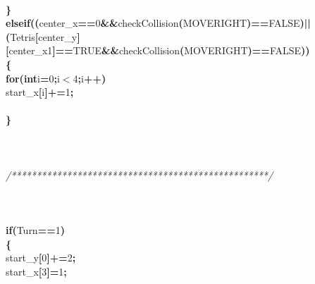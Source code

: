 \documentclass[a4paper, 10pt]{article}
\newcommand\SPC{\hspace*{0.6em}}
\newcommand\HYP{\mbox{\char 45}}
\newcommand{\CppAComment}[1]{\textit{\textcolor[rgb]{0.2,0.6,1}{#1}}}
\newcommand{\CppAIdentifier}[1]{#1}
\newcommand{\CppANumber}[1]{\textcolor[rgb]{0.5,0,0.5}{#1}}
\newcommand{\CppAReservedWord}[1]{\textbf{#1}}
\newcommand{\CppASpace}[1]{\colorbox[rgb]{1,1,1}{#1}}
\newcommand{\CppASymbol}[1]{\textbf{\textcolor[rgb]{1,0,0}{#1}}}
\begin{document}
\begin{ttfamily}
\\
\CppASpace{\SPC \SPC \SPC \SPC }\CppASymbol{\}}\\
\CppASpace{\SPC \SPC \SPC \SPC }\CppAReservedWord{else}\CppASpace{\SPC }\CppAReservedWord{if}\CppASymbol{(}\CppASymbol{(}\CppAIdentifier{center\_x}\CppASymbol{==}\CppANumber{0}\CppASpace{\SPC }\CppASymbol{\&\&}\CppASpace{\SPC }\CppAIdentifier{checkCollision}\CppASymbol{(}\CppAIdentifier{MOVERIGHT}\CppASymbol{)}\CppASymbol{==}\CppAIdentifier{FALSE}\CppASymbol{)}\CppASpace{\SPC }\CppASymbol{||}\CppASpace{\SPC }\CppASymbol{(}\CppAIdentifier{Tetris}\CppASymbol{[}\CppAIdentifier{center\_y}\CppASymbol{]}\CppASymbol{[}\CppAIdentifier{center\_x}\CppASymbol{\HYP }\CppANumber{1}\CppASymbol{]}\CppASymbol{==}\CppAIdentifier{TRUE}\CppASymbol{\&\&}\CppAIdentifier{checkCollision}\CppASymbol{(}\CppAIdentifier{MOVERIGHT}\CppASymbol{)}\CppASymbol{==}\CppAIdentifier{FALSE}\CppASymbol{)}\CppASymbol{)}\\
\CppASpace{\SPC \SPC \SPC \SPC }\CppASymbol{\{}\\
\CppASpace{\SPC \SPC \SPC \SPC \SPC }\CppAReservedWord{for}\CppASymbol{(}\CppAReservedWord{int}\CppASpace{\SPC }\CppAIdentifier{i}\CppASymbol{=}\CppANumber{0}\CppASymbol{;}\CppAIdentifier{i}\CppASymbol{$<$}\CppANumber{4}\CppASymbol{;}\CppAIdentifier{i}\CppASymbol{++}\CppASymbol{)}\\
\CppASpace{\SPC \SPC \SPC \SPC \SPC \SPC }\CppAIdentifier{start\_x}\CppASymbol{[}\CppAIdentifier{i}\CppASymbol{]}\CppASymbol{+=}\CppANumber{1}\CppASymbol{;}\\
\\
\CppASpace{\SPC \SPC \SPC \SPC }\CppASymbol{\}}\\
\\
\\
\\
\CppASpace{\SPC \SPC \SPC }\CppAComment{/***************************************************/}\\
\\
\\
\\
\CppASpace{\SPC \SPC \SPC \SPC }\CppAReservedWord{if}\CppASymbol{(}\CppAIdentifier{Turn}\CppASymbol{==}\CppANumber{1}\CppASymbol{)}\\
\CppASpace{\SPC \SPC \SPC \SPC }\CppASymbol{\{}\\
\CppASpace{\SPC \SPC \SPC \SPC \SPC }\CppAIdentifier{start\_y}\CppASymbol{[}\CppANumber{0}\CppASymbol{]}\CppASymbol{+=}\CppANumber{2}\CppASymbol{;}\\
\CppASpace{\SPC \SPC \SPC \SPC \SPC }\CppAIdentifier{start\_x}\CppASymbol{[}\CppANumber{3}\CppASymbol{]}\CppASymbol{\HYP =}\CppANumber{1}\CppASymbol{;}\\

\end{ttfamily}
\end{document}
